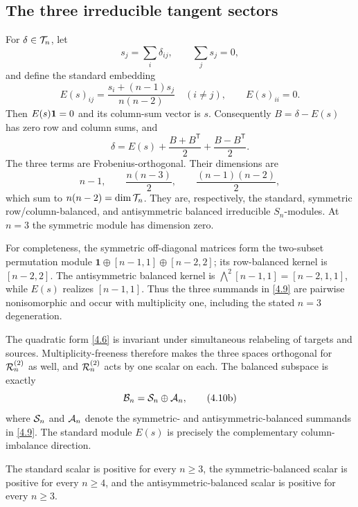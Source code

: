 \subsection{The three irreducible tangent sectors}

For $\delta\in\mathcal T_n$, let
\[
 s_j=\sum_i\delta_{ij},\qquad \sum_js_j=0,                   \tag{4.7}\label{4.7}
\]
and define the standard embedding
\[
 E(s)_{ij}=\frac{s_i+(n-1)s_j}{n(n-2)}\quad(i\ne j),
 \qquad E(s)_{ii}=0.                                       \tag{4.8}\label{4.8}
\]
Then $E(s)\mathbf 1=0$ and its column-sum vector is $s$.  Consequently
$B=\delta-E(s)$ has zero row and column sums, and
\[
 \delta=E(s)+\frac{B+B^{\mathsf T}}2
                +\frac{B-B^{\mathsf T}}2.                    \tag{4.9}\label{4.9}
\]
The three terms are Frobenius-orthogonal.  Their dimensions are
\[
 n-1,\qquad \frac{n(n-3)}2,\qquad
 \frac{(n-1)(n-2)}2,                                      \tag{4.10}\label{4.10}
\]
which sum to $n(n-2)=\dim\mathcal T_n$.  They are, respectively, the standard,
symmetric row/column-balanced, and antisymmetric balanced irreducible
$S_n$-modules.  At $n=3$ the symmetric module has dimension zero.

For completeness, the symmetric off-diagonal matrices form the two-subset
permutation module
$\mathbf1\oplus[n-1,1]\oplus[n-2,2]$; its row-balanced kernel is
$[n-2,2]$.  The antisymmetric balanced kernel is
$\bigwedge^2[n-1,1]=[n-2,1,1]$, while $E(s)$ realizes $[n-1,1]$.
Thus the three summands in \eqref{4.9} are pairwise nonisomorphic and occur
with multiplicity one, including the stated $n=3$ degeneration.

The quadratic form \eqref{4.6} is invariant under simultaneous relabeling of
targets and sources.  Multiplicity-freeness therefore makes the three spaces
orthogonal for $\mathcal R^{(2)}_{n}$ as well, and $\mathcal R^{(2)}_{n}$ acts by one scalar on each.
The balanced subspace is exactly
\[
 \mathcal B_n=\mathcal S_n\oplus\mathcal A_n,                              \tag{4.10b}\label{4.10b}
\]
where $\mathcal S_n$ and $\mathcal A_n$ denote the symmetric- and
antisymmetric-balanced summands in \eqref{4.9}.  The standard module $E(s)$
is precisely the complementary column-imbalance direction.

\begin{theorem}\label{thm:sectors}
The standard scalar is positive for every $n\ge3$, the
symmetric-balanced scalar is positive for every $n\ge4$, and the
antisymmetric-balanced scalar is positive for every $n\ge3$.
\end{theorem}

